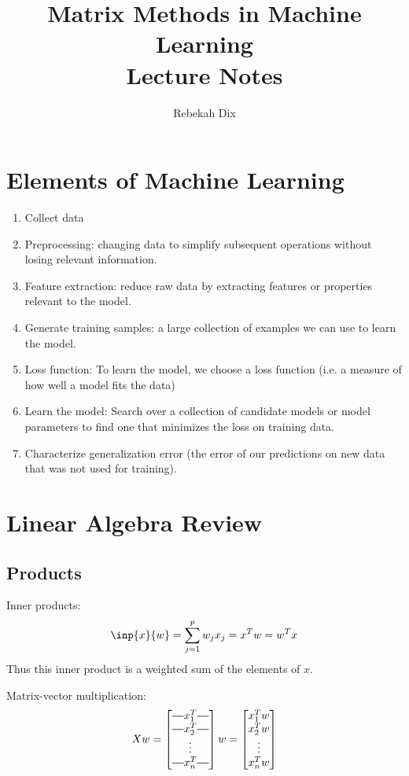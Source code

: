 \documentclass[12pt]{article}
\title{Matrix Methods in Machine Learning \\ Lecture Notes}
\author{Rebekah Dix}
\theoremstyle{definition}
\newcommand*{\horzbar}{\rule[.5ex]{2.5ex}{0.5pt}}
\begin{document}
\maketitle
\tableofcontents
\newpage 

\section{Elements of Machine Learning}
\begin{enumerate}
	\item Collect data
	\item Preprocessing: changing data to simplify subsequent operations without losing relevant information.
	\item Feature extraction: reduce raw data by extracting features or properties relevant to the model.
	\item Generate training samples: a large collection of examples we can use to learn the model.
	\item Loss function: To learn the model, we choose a loss function (i.e. a measure of how well a model fits the data)
	\item Learn the model: Search over a collection of candidate models or model parameters to find one that minimizes the loss on training data.
	\item Characterize generalization error (the error of our predictions on new data that was not used for training).
\end{enumerate}

\section{Linear Algebra Review}

\subsection{Products}
Inner products:
\begin{equation}
	\inp{x}{w} = \sum_{j=1}^p w_j x_j = x^T w = w^T x
\end{equation}
Thus this inner product is a weighted sum of the elements of $x$.

Matrix-vector multiplication:
\begin{equation}
	Xw = 
	\begin{bmatrix}
	\horzbar x_1^T \horzbar \\
	\horzbar x_2^T \horzbar \\
	\vdots \\
	\horzbar x_n^T \horzbar
	\end{bmatrix}
	w
	=
	\begin{bmatrix}
	x_1^T w \\
	x_2^T w \\
	\vdots \\
	x_n^T w \\
	\end{bmatrix}
\end{equation}
\end{document}
